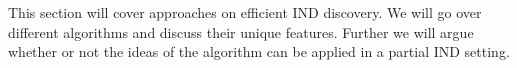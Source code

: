 
This section will cover approaches on efficient IND discovery. We will go over different algorithms and discuss their unique features. Further we will argue whether or not the ideas of the algorithm can be applied in a partial IND setting.

